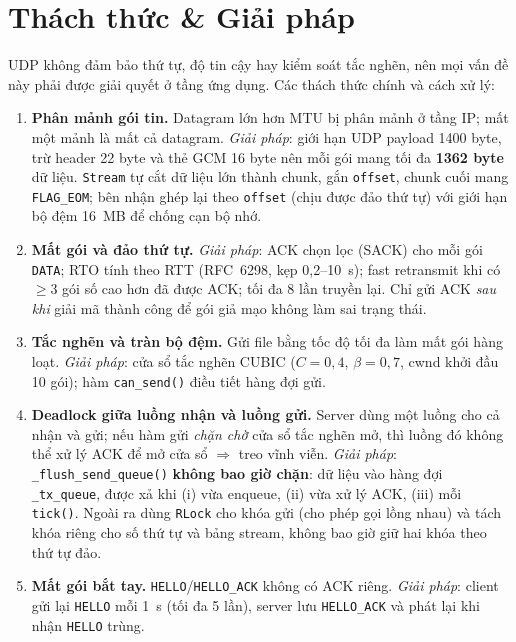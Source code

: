 \section{Thách thức \& Giải pháp}

UDP không đảm bảo thứ tự, độ tin cậy hay kiểm soát tắc nghẽn, nên mọi vấn đề này phải được giải quyết ở tầng ứng dụng. Các thách thức chính và cách xử lý:

\begin{enumerate}[leftmargin=*]
    \item \textbf{Phân mảnh gói tin.} Datagram lớn hơn MTU bị phân mảnh ở tầng IP; mất một mảnh là mất cả datagram. \emph{Giải pháp}: giới hạn UDP payload 1400 byte, trừ header 22 byte và thẻ GCM 16 byte nên mỗi gói mang tối đa \textbf{1362 byte} dữ liệu. \texttt{Stream} tự cắt dữ liệu lớn thành chunk, gắn \texttt{offset}, chunk cuối mang \texttt{FLAG\_EOM}; bên nhận ghép lại theo \texttt{offset} (chịu được đảo thứ tự) với giới hạn bộ đệm 16~MB để chống cạn bộ nhớ.

    \item \textbf{Mất gói và đảo thứ tự.} \emph{Giải pháp}: ACK chọn lọc (SACK) cho mỗi gói \texttt{DATA}; RTO tính theo RTT (RFC~6298, kẹp 0,2--10~s); fast retransmit khi có $\ge 3$ gói số cao hơn đã được ACK; tối đa 8 lần truyền lại. Chỉ gửi ACK \emph{sau khi} giải mã thành công để gói giả mạo không làm sai trạng thái.

    \item \textbf{Tắc nghẽn và tràn bộ đệm.} Gửi file bằng tốc độ tối đa làm mất gói hàng loạt. \emph{Giải pháp}: cửa sổ tắc nghẽn CUBIC ($C=0{,}4$, $\beta=0{,}7$, cwnd khởi đầu 10 gói); hàm \texttt{can\_send()} điều tiết hàng đợi gửi.

    \item \textbf{Deadlock giữa luồng nhận và luồng gửi.} Server dùng một luồng cho cả nhận và gửi; nếu hàm gửi \emph{chặn chờ} cửa sổ tắc nghẽn mở, thì luồng đó không thể xử lý ACK để mở cửa sổ $\Rightarrow$ treo vĩnh viễn. \emph{Giải pháp}: \texttt{\_flush\_send\_queue()} \textbf{không bao giờ chặn}: dữ liệu vào hàng đợi \texttt{\_tx\_queue}, được xả khi (i) vừa enqueue, (ii) vừa xử lý ACK, (iii) mỗi \texttt{tick()}. Ngoài ra dùng \texttt{RLock} cho khóa gửi (cho phép gọi lồng nhau) và tách khóa riêng cho số thứ tự và bảng stream, không bao giờ giữ hai khóa theo thứ tự đảo.

    \item \textbf{Mất gói bắt tay.} \texttt{HELLO}/\texttt{HELLO\_ACK} không có ACK riêng. \emph{Giải pháp}: client gửi lại \texttt{HELLO} mỗi 1~s (tối đa 5 lần), server lưu \texttt{HELLO\_ACK} và phát lại khi nhận \texttt{HELLO} trùng.


\end{enumerate}
